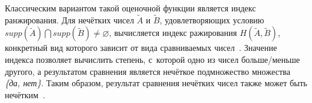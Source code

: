 Классическим вариантом такой оценочной функции является индекс ранжирования. Для нечётких чисел $\tilde A$ и $\tilde B$, удовлетворяющих условию $supp \left( \tilde A \right) \bigcap supp \left( \tilde B \right) \neq \varnothing$, вычисляется индекс ражирования $H\left(\tilde A, \tilde B \right)$, конкретный вид которого зависит от вида сравниваемых чисел~\cite{Borisov_Alexeev_Msk, Skorokhod, Borisov_Fedulov_Arithmetics}. Значение индекса позволяет вычислить степень, с~которой одно из чисел больше/меньше другого, а результатом сравнения является нечёткое подмножество множества \textit{ \{да, нет\}}. Таким образом, результат сравнения нечётких чисел также может быть нечётким~\cite{Siler_Buckley}.